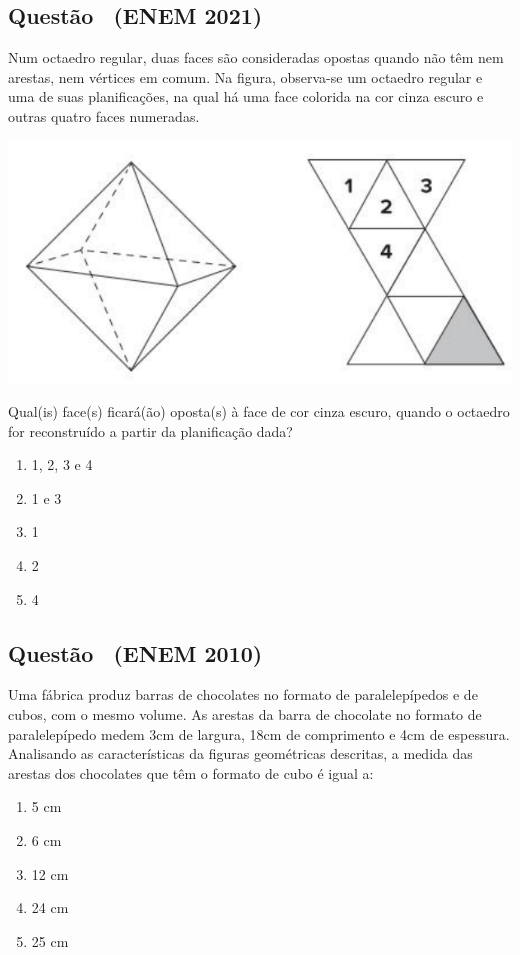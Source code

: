 \documentclass[12pt]{article}
\newif\ifmostravermelho
\newcommand{\vermelho}[1]{%
  \ifmostravermelho
    {\color{red}#1}%
  \else
    #1%
  \fi
}
\newcounter{questao}
\newcommand{\novaquestao}[1]{%
  \stepcounter{questao}%
  \subsection*{Questão \thequestao\ (#1)}%
}
\begin{document}
\begin{multicols}{2}
        \novaquestao{ENEM 2021}

            Num octaedro regular, duas faces são consideradas opostas quando não têm nem arestas, nem vértices em comum. Na figura, observa-se um octaedro regular e uma de suas planificações, na qual há uma face colorida na cor cinza escuro e outras quatro faces numeradas.

            \begin{center}
                \includegraphics[scale=0.4]{q23.png}
            \end{center} Qual(is) face(s) ficará(ão) oposta(s) à face de cor cinza escuro, quando o octaedro for reconstruído a partir da planificação dada?
        
            \begin{enumerate}[label=(\alph*), noitemsep]
                \item 1, 2, 3 e 4
                \item 1 e 3
                \item 1
                \item 2
                \item \vermelho{4} %
            \end{enumerate}

        \novaquestao{ENEM 2010}
            Uma fábrica produz barras de chocolates no formato de paralelepípedos e de cubos, com o mesmo volume. As arestas da barra de chocolate no formato de paralelepípedo medem 3cm de largura, 18cm de comprimento e 4cm de espessura. Analisando as características da figuras geométricas descritas, a medida das arestas dos chocolates que têm o formato de cubo é igual a:
            
            \begin{enumerate}[label=(\alph*), noitemsep]
                \item 5  cm
                \item \vermelho{6  cm} %
                \item 12  cm
                \item 24  cm
                \item 25  cm 
            \end{enumerate}


\end{multicols}
\end{document}
